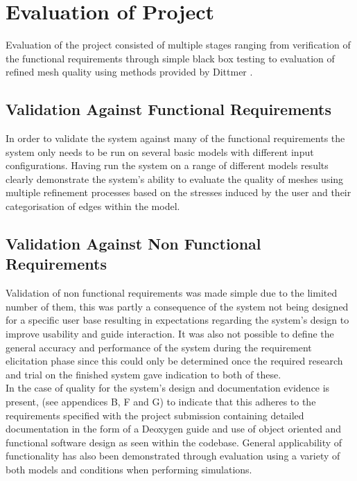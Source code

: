 
\section{Evaluation of Project}
Evaluation of the project consisted of multiple stages ranging from verification of the functional requirements through simple black box testing to evaluation of refined mesh quality using methods provided by Dittmer \cite{DittmerMeshQualityMet}. 

\subsection{Validation Against Functional Requirements}
In order to validate the system against many of the functional requirements the system only needs to be run on several basic models with different input configurations. Having run the system on a range of different models results clearly demonstrate the system's ability to evaluate the quality of meshes using multiple refinement processes based on the stresses induced by the user and their categorisation of edges within the model. 

\subsection{Validation Against Non Functional Requirements}
Validation of non functional requirements was made simple due to the limited number of them, this was partly a consequence of the system not being designed for a specific user base resulting in expectations regarding the system's design to improve usability and guide interaction. It was also not possible to define the general accuracy and performance of the system during the requirement elicitation phase since this could only be determined once the required research and trial on the finished system gave indication to both of these. \\

\noindent
In the case of quality for the system's design and documentation evidence is present, (see appendices B, F and G)  to indicate that this adheres to the requirements specified with the project submission containing detailed documentation in the form of a Deoxygen guide and use of object oriented and functional software design as seen within the codebase. General applicability of functionality has also been demonstrated through evaluation using a variety of both models and conditions when performing simulations.

